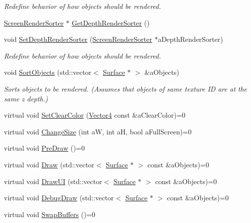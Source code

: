 \begin{DoxyCompactItemize}
\begin{DoxyCompactList}\small\item\em Redefine behavior of how objects should be rendered. \end{DoxyCompactList}\item 
\hyperlink{classScreenRenderSorter}{Screen\+Render\+Sorter} $\ast$ \hyperlink{classScreen_ae119aa0a7af1afb95c09efbba620cea5}{Get\+Depth\+Render\+Sorter} ()
\item 
void \hyperlink{classScreen_a9723784c5457461d70b6e8e3d09069e5}{Set\+Depth\+Render\+Sorter} (\hyperlink{classScreenRenderSorter}{Screen\+Render\+Sorter} $\ast$a\+Depth\+Render\+Sorter)
\begin{DoxyCompactList}\small\item\em Redefine behavior of how objects should be rendered. \end{DoxyCompactList}\item 
void \hyperlink{classScreen_a663b77342cfa137b4890cd3d00678553}{Sort\+Objects} (std\+::vector$<$ \hyperlink{classSurface}{Surface} $\ast$ $>$ \&a\+Objects)
\begin{DoxyCompactList}\small\item\em Sorts objects to be rendered. (Assumes that objects of same texture ID are at the same z depth.) \end{DoxyCompactList}\item 
virtual void \hyperlink{classScreen_a537a5e1ddfbc6d3f048b8195ad80cad9}{Set\+Clear\+Color} (\hyperlink{structVector4}{Vector4} const \&a\+Clear\+Color)=0
\item 
virtual void \hyperlink{classScreen_aed3484ce6f522cb199fd5bb6667b174f}{Change\+Size} (int aW, int aH, bool a\+Full\+Screen)=0
\item 
virtual void \hyperlink{classScreen_a995cbb84408dff20ee0e1e6f02a09a8e}{Pre\+Draw} ()=0
\item 
virtual void \hyperlink{classScreen_af48f435562280536539eafad048f1d1c}{Draw} (std\+::vector$<$ \hyperlink{classSurface}{Surface} $\ast$ $>$ const \&a\+Objects)=0
\item 
virtual void \hyperlink{classScreen_a56bbfbc23e9eae04061c367f29356617}{Draw\+UI} (std\+::vector$<$ \hyperlink{classSurface}{Surface} $\ast$ $>$ const \&a\+Objects)=0
\item 
virtual void \hyperlink{classScreen_a51a0752968332d9d69ddab055a8e6b39}{Debug\+Draw} (std\+::vector$<$ \hyperlink{classSurface}{Surface} $\ast$ $>$ const \&a\+Objects)=0
\item 
virtual void \hyperlink{classScreen_ac4828d7dba6fd883d96175b00d2f856b}{Swap\+Buffers} ()=0
\end{DoxyCompactItemize}
